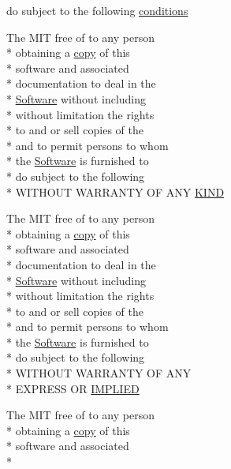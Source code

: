 \begin{DoxyCompactItemize}
do subject to the following \hyperlink{LICENSE_8txt_a9519688b6bdbbccdcec5fef05966b25b}{conditions}
\item 
The M\-I\-T free of to any person \\*
obtaining a \hyperlink{LICENSE_8txt_aff1d4c6b756ebf691fa44a0904f68658}{copy} of this \\*
software and associated \\*
documentation to deal in the \\*
\hyperlink{LICENSE_8txt_a22a1529885b3e9d66b0c72fe604fc3dc}{Software} without including \\*
without limitation the rights \\*
to and or sell copies of the \\*
and to permit persons to whom \\*
the \hyperlink{LICENSE_8txt_a22a1529885b3e9d66b0c72fe604fc3dc}{Software} is furnished to \\*
do subject to the following \\*
W\-I\-T\-H\-O\-U\-T W\-A\-R\-R\-A\-N\-T\-Y O\-F A\-N\-Y \hyperlink{LICENSE_8txt_a8e1a82be600178fe97c0e1339897c260}{K\-I\-N\-D}
\item 
The M\-I\-T free of to any person \\*
obtaining a \hyperlink{LICENSE_8txt_aff1d4c6b756ebf691fa44a0904f68658}{copy} of this \\*
software and associated \\*
documentation to deal in the \\*
\hyperlink{LICENSE_8txt_a22a1529885b3e9d66b0c72fe604fc3dc}{Software} without including \\*
without limitation the rights \\*
to and or sell copies of the \\*
and to permit persons to whom \\*
the \hyperlink{LICENSE_8txt_a22a1529885b3e9d66b0c72fe604fc3dc}{Software} is furnished to \\*
do subject to the following \\*
W\-I\-T\-H\-O\-U\-T W\-A\-R\-R\-A\-N\-T\-Y O\-F A\-N\-Y \\*
E\-X\-P\-R\-E\-S\-S O\-R \hyperlink{LICENSE_8txt_ab0624cdd79a1b72ae3e8cb7b147149da}{I\-M\-P\-L\-I\-E\-D}
\item 
The M\-I\-T free of to any person \\*
obtaining a \hyperlink{LICENSE_8txt_aff1d4c6b756ebf691fa44a0904f68658}{copy} of this \\*
software and associated \\*

\end{DoxyCompactItemize}
